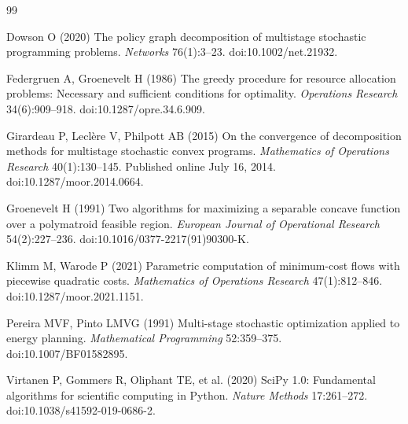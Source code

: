 \begin{thebibliography}{99}\raggedright
{}
Dowson O (2020) The policy graph decomposition of multistage stochastic programming problems. \emph{Networks} 76(1):3--23. doi:10.1002/net.21932.

Federgruen A, Groenevelt H (1986) The greedy procedure for resource allocation problems: Necessary and sufficient conditions for optimality. \emph{Operations Research} 34(6):909--918. doi:10.1287/opre.34.6.909.

Girardeau P, Lecl\`ere V, Philpott AB (2015) On the convergence of decomposition methods for multistage stochastic convex programs. \emph{Mathematics of Operations Research} 40(1):130--145. Published online July 16, 2014. doi:10.1287/moor.2014.0664.

Groenevelt H (1991) Two algorithms for maximizing a separable concave function over a polymatroid feasible region. \emph{European Journal of Operational Research} 54(2):227--236. doi:10.1016/0377-2217(91)90300-K.

Klimm M, Warode P (2021) Parametric computation of minimum-cost flows with piecewise quadratic costs. \emph{Mathematics of Operations Research} 47(1):812--846. doi:10.1287/moor.2021.1151.

Pereira MVF, Pinto LMVG (1991) Multi-stage stochastic optimization applied to energy planning. \emph{Mathematical Programming} 52:359--375. doi:10.1007/BF01582895.

Virtanen P, Gommers R, Oliphant TE, et al. (2020) SciPy 1.0: Fundamental algorithms for scientific computing in Python. \emph{Nature Methods} 17:261--272. doi:10.1038/s41592-019-0686-2.
\end{thebibliography}
